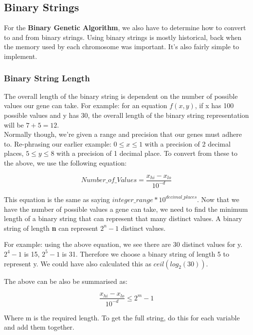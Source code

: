 \subsection{Binary Strings}
For the \textbf{Binary Genetic Algorithm}, we also have to determine how to convert to and from binary strings. Using binary strings is mostly historical, back when the memory used by each chromosome was important. It's also fairly simple to implement.

\subsubsection{Binary String Length}
The overall length of the binary string is dependent on the number of possible values our gene can take. For example: for an equation \(f(x,y)\), if x has 100 possible values and y has 30, the overall length of the binary string representation will be \(7+5=12\). 
\\
Normally though, we're given a range and precision that our genes must adhere to. Re-phrasing our earlier example: \(0 \leq x \leq 1\) with a precision of 2 decimal places, \(5 \leq y \leq 8\) with a precision of 1 decimal place. To convert from these to the above, we use the following equation:

\begin{equation}
    Number\_of\_Values = \frac{x_{hi} - x_{lo}}{10^{-d}} 
\end{equation}

This equation is the same as saying \( integer\_range * 10^{decimal\_places}\). Now that we have the number of possible values a gene can take, we need to find the minimum length of a binary string that can represent that many distinct values. A binary string of length \textbf{n} can represent \(2^n-1\) distinct values. 

For example: using the above equation, we see there are 30 distinct values for y. \(2^4-1\) is 15, \(2^5-1\) is 31. Therefore we choose a binary string of length 5 to represent y. We could have also calculated this as \( ceil(log_2(30))\).

The above can be also be summarised as: 

\begin{equation}
    \frac{x_{hi} - x_{lo}}{10^{-d}}  \le 2^m - 1 
\end{equation}

Where m is the required length. To get the full string, do this for each variable and add them together.

